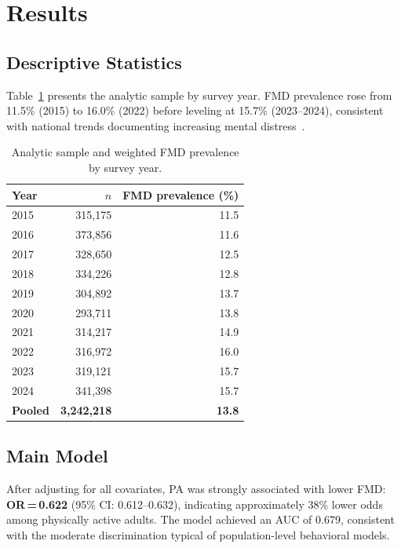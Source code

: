 \documentclass[11pt]{article}
\begin{document}
\section{Results}
\label{sec:results}

\subsection{Descriptive Statistics}

Table~\ref{tab:desc} presents the analytic sample by survey year.
FMD prevalence rose from 11.5\% (2015) to 16.0\% (2022) before leveling at 15.7\% (2023--2024), consistent with national trends documenting increasing mental distress~\citep{twenge2023increases}.

\begin{table}[h]
\centering
\caption{Analytic sample and weighted FMD prevalence by survey year.}
\label{tab:desc}
\begin{tabular}{lrr}
\toprule
Year & $n$ & FMD prevalence (\%) \\
\midrule
2015 & 315,175 & 11.5 \\
2016 & 373,856 & 11.6 \\
2017 & 328,650 & 12.5 \\
2018 & 334,226 & 12.8 \\
2019 & 304,892 & 13.7 \\
2020 & 293,711 & 13.8 \\
2021 & 314,217 & 14.9 \\
2022 & 316,972 & 16.0 \\
2023 & 319,121 & 15.7 \\
2024 & 341,398 & 15.7 \\
\midrule
\textbf{Pooled} & \textbf{3,242,218} & \textbf{13.8} \\
\bottomrule
\end{tabular}
\end{table}

\subsection{Main Model}

After adjusting for all covariates, PA was strongly associated with lower FMD: \textbf{OR\,=\,0.622} (95\% CI: 0.612--0.632), indicating approximately 38\% lower odds among physically active adults.
The model achieved an AUC of 0.679, consistent with the moderate discrimination typical of population-level behavioral models.
\end{document}
